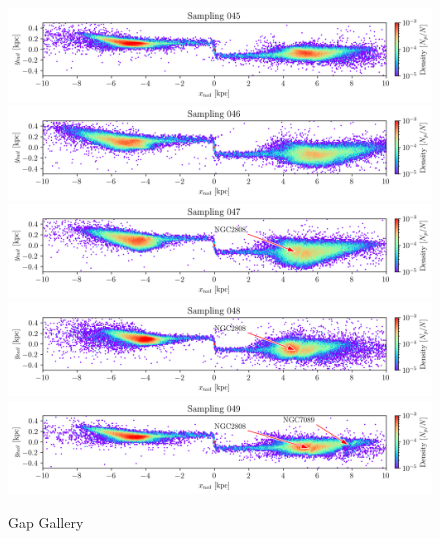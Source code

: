 \documentclass[draft]{aa}
\begin{document}
\begin{appendix}
    \begin{figure}
      \centering
      \includegraphics[width=\linewidth]{gallery_of_gaps_monte-carlo-045.png}
      \includegraphics[width=\linewidth]{gallery_of_gaps_monte-carlo-046.png}
      \includegraphics[width=\linewidth]{gallery_of_gaps_monte-carlo-047.png}
      \includegraphics[width=\linewidth]{gallery_of_gaps_monte-carlo-048.png}
      \includegraphics[width=\linewidth]{gallery_of_gaps_monte-carlo-049.png}
      \caption{Gap Gallery}
      \label{fig:TailCoordinates}
    \end{figure} 

\end{appendix}
\end{document}
